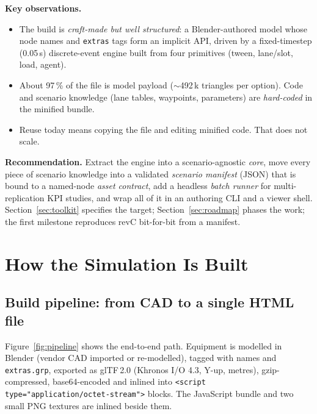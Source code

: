 \documentclass[11pt,a4paper]{article}
\begin{document}
\textbf{Key observations.}
\begin{itemize}[leftmargin=*,itemsep=2pt]
  \item The build is \emph{craft-made but well structured}: a Blender-authored model whose node names
        and \texttt{extras} tags form an implicit API, driven by a fixed-timestep (0.05\,s) discrete-event
        engine built from four primitives (tween, lane/slot, load, agent).
  \item About 97\,\% of the file is model payload (${\sim}$492\,k triangles per option). Code and
        scenario knowledge (lane tables, waypoints, parameters) are \emph{hard-coded} in the minified bundle.
  \item Reuse today means copying the file and editing minified code. That does not scale.
\end{itemize}

\textbf{Recommendation.} Extract the engine into a scenario-agnostic \emph{core}, move every piece of
scenario knowledge into a validated \emph{scenario manifest} (JSON) that is bound to a named-node
\emph{asset contract}, add a headless \emph{batch runner} for multi-replication KPI studies, and wrap
all of it in an authoring CLI and a viewer shell. Section~\ref{sec:toolkit} specifies the target;
Section~\ref{sec:roadmap} phases the work; the first milestone reproduces revC bit-for-bit
from a manifest.

\section{How the Simulation Is Built}
\label{sec:build}

\subsection{Build pipeline: from CAD to a single HTML file}

Figure~\ref{fig:pipeline} shows the end-to-end path. Equipment is modelled in Blender (vendor CAD
imported or re-modelled), tagged with names and \texttt{extras.grp}, exported as glTF\,2.0
(Khronos I/O 4.3, Y-up, metres), gzip-compressed, base64-encoded and inlined into
\texttt{<script type="application/octet-stream">} blocks. The JavaScript bundle and two small
PNG textures are inlined beside them.
\end{document}
